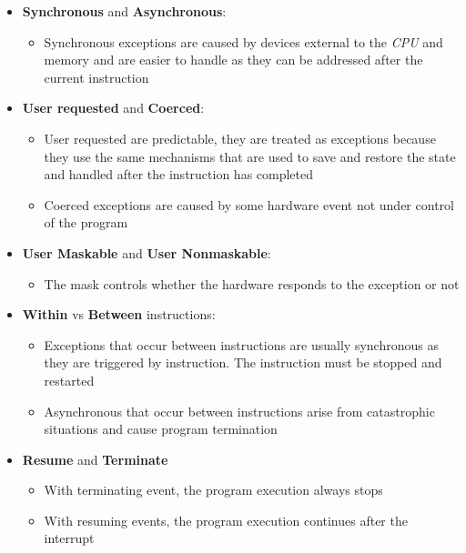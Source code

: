 \documentclass[english]{article}
\begin{document}
\begin{itemize}
  \item \textbf{Synchronous} and \textbf{Asynchronous}:
        \begin{itemize}
          \item Synchronous exceptions are caused by devices external to the \textit{CPU} and memory and are easier to handle as they can be addressed after the current instruction
        \end{itemize}
  \item \textbf{User requested} and \textbf{Coerced}:
        \begin{itemize}
          \item User requested are predictable, they are treated as exceptions because they use the same mechanisms that are used to save and restore the state and handled after the instruction has completed
          \item Coerced exceptions are caused by some hardware event not under control of the program
        \end{itemize}
  \item \textbf{User Maskable} and \textbf{User Nonmaskable}:
        \begin{itemize}
          \item The mask controls whether the hardware responds to the exception or not
        \end{itemize}
  \item \textbf{Within} vs \textbf{Between} instructions:
        \begin{itemize}
          \item Exceptions that occur between instructions are usually synchronous as they are triggered by instruction. The instruction must be stopped and restarted
          \item Asynchronous that occur between instructions arise from catastrophic situations and cause program termination
        \end{itemize}
  \item \textbf{Resume} and \textbf{Terminate}
        \begin{itemize}
          \item With terminating event, the program execution always stops
          \item With resuming events, the program execution continues after the interrupt
        \end{itemize}
\end{itemize}
\end{document}
